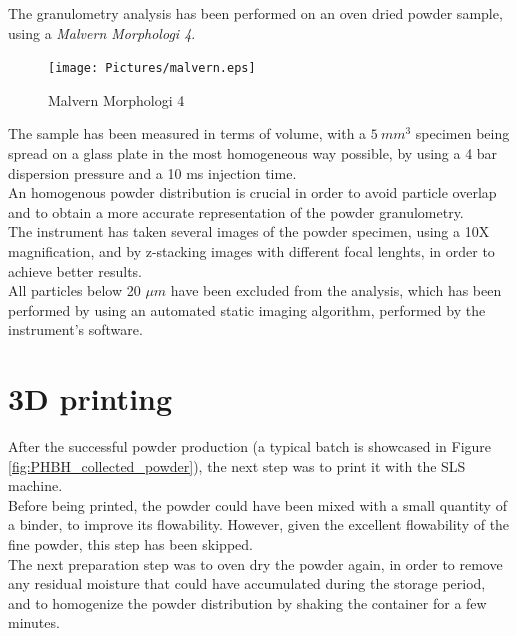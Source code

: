 \documentclass[a4paper]{article}
\begin{document}
        The granulometry analysis has been performed on an oven dried powder sample, 
        using a \textit{Malvern Morphologi 4}. \\ 

        \begin{figure}[ht]
            \centering
            \texttt{[image: Pictures/malvern.eps]}
            \caption{Malvern Morphologi 4}
            \label{fig:morphologi4}
        \end{figure}

        The sample has been measured in terms of volume, with a $5 \ mm^3$ specimen being spread on a glass plate in the 
        most homogeneous way possible, by using a 4 bar dispersion pressure and a 10 ms injection time. \\ 

        An homogenous powder distribution is crucial in order to avoid particle overlap and to obtain a more accurate 
        representation of the powder granulometry. \\ 

        The instrument has taken several images of the powder specimen, using a 10X magnification, and by z-stacking 
        images with different focal lenghts, in order to achieve better results. \\

        All particles below 20 $\mu m$ have been excluded from the analysis, which has been performed by using an automated 
        static imaging algorithm, performed by the instrument's software. \\ 

      \clearpage

      \section{3D printing\label{SLS_printing_experimental}}

      After the successful powder production (a typical batch is showcased in Figure \ref{fig:PHBH_collected_powder}), the next step was to print it with the SLS machine. \\
  
      Before being printed, the powder could have been mixed with a small quantity of a binder, to improve its flowability. 
      However, given the excellent flowability of the fine powder, this step has been skipped. \\
  
      The next preparation step was to oven dry the powder again, in order to remove any residual moisture
      that could have accumulated during the storage period, and to homogenize the powder distribution 
      by shaking the container for a few minutes. \\
  
\end{document}
